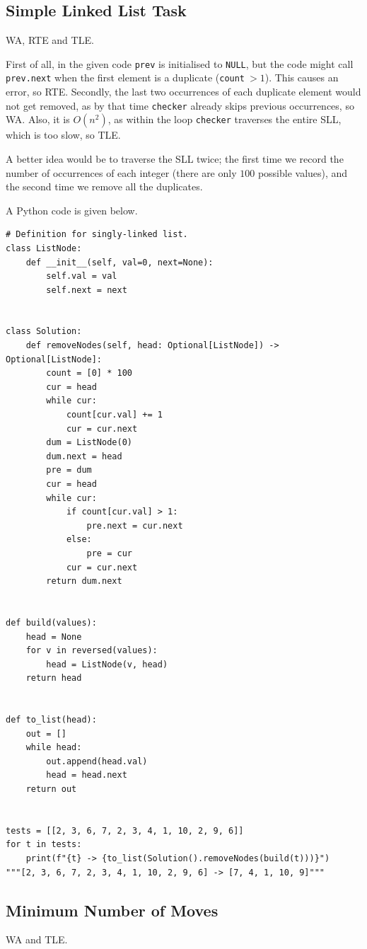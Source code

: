\documentclass[12pt]{article}
\renewcommand{\t}{\texttt}
\begin{document}
\subsection{Simple Linked List Task}
WA, RTE and TLE.

First of all, in the given code \t{prev} is initialised to \t{NULL}, but the code might call \t{prev.next} when the first element is a duplicate (\t{count}$\ >1$). This causes an error, so RTE. Secondly, the last two occurrences of each duplicate element would not get removed, as by that time \t{checker} already skips previous occurrences, so WA. Also, it is $O\left(n^2\right)$, as within the loop \t{checker} traverses the entire SLL, which is too slow, so TLE.

A better idea would be to traverse the SLL twice; the first time we record the number of occurrences of each integer (there are only $100$ possible values), and the second time we remove all the duplicates.

A Python code is given below.
\begin{verbatim}
# Definition for singly-linked list.
class ListNode:
    def __init__(self, val=0, next=None):
        self.val = val
        self.next = next


class Solution:
    def removeNodes(self, head: Optional[ListNode]) -> Optional[ListNode]:
        count = [0] * 100
        cur = head
        while cur:
            count[cur.val] += 1
            cur = cur.next
        dum = ListNode(0)
        dum.next = head
        pre = dum
        cur = head
        while cur:
            if count[cur.val] > 1:
                pre.next = cur.next
            else:
                pre = cur
            cur = cur.next
        return dum.next


def build(values):
    head = None
    for v in reversed(values):
        head = ListNode(v, head)
    return head


def to_list(head):
    out = []
    while head:
        out.append(head.val)
        head = head.next
    return out


tests = [[2, 3, 6, 7, 2, 3, 4, 1, 10, 2, 9, 6]]
for t in tests:
    print(f"{t} -> {to_list(Solution().removeNodes(build(t)))}")
"""[2, 3, 6, 7, 2, 3, 4, 1, 10, 2, 9, 6] -> [7, 4, 1, 10, 9]"""
\end{verbatim}
\subsection{Minimum Number of Moves}
WA and TLE.
\end{document}

